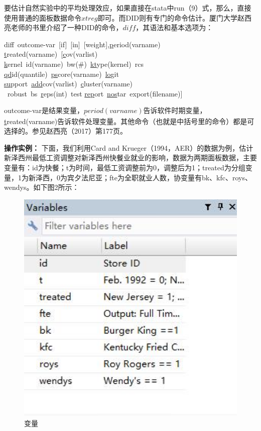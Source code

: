 \documentclass[cn,10pt,math=newtx,citestyle=gb7714-2015,bibstyle=gb7714-2015]{elegantbook}
\begin{document}
	要估计自然实验中的平均处理效应，如果直接在stata中run（9）式，那么，直接使用普通的面板数据命令$xtreg$即可。而DID则有专门的命令估计。厦门大学赵西亮老师的书里介绍了一种DID的命令，$diff$，其语法和基本选项为：
	\begin{flushleft}
		diff~outcome-var~[if]~[in]~[weight],\underline{p}eriod(varname)~\\
		\underline{t}reated(varname)~[\underline{c}ov(varlist)~\\
		\underline{k}ernel~id(varname)~bw(\#)~\underline{kt}ype(kernel)~rcs~\\
		\underline{qd}id(quantile)~\underline{ps}core(varname)~\underline{lo}git~\\
		\underline{su}pport~\underline{add}cov(varlist)~\underline{c}luster(varname)\\
		~robust~bs~\underline{r}eps(int)~test \underline{rep}ort~\underline{nos}tar~export(filename)]
	\end{flushleft}
	
	outcome-var是结果变量，$\underline{p}eriod(varname)$告诉软件时期变量，\underline{t}reated(varname)告诉软件处理变量。其他命令（也就是中括号里的命令）都是可选择的。参见赵西亮（2017）第177页。
	
	\textbf{操作实例：}
	下面，我们利用Card and Krueger（1994，AER）的数据为例，估计新泽西州最低工资调整对新泽西州快餐业就业的影响，数据为两期面板数据，主要变量有：id为快餐；t为时间，最低工资调整前为0，调整后为1；treated为分组变量，1为新泽西，0为宾夕法尼亚；fte为全职就业人数，协变量有bk、kfc、roys、wendys。如下图2所示：
	\begin{figure}[htbp]
		\centering
		\includegraphics[width=1\textwidth]{var.jpg}
		\caption{变量}\label{fig:digit}
	\end{figure}
	
\end{document}
